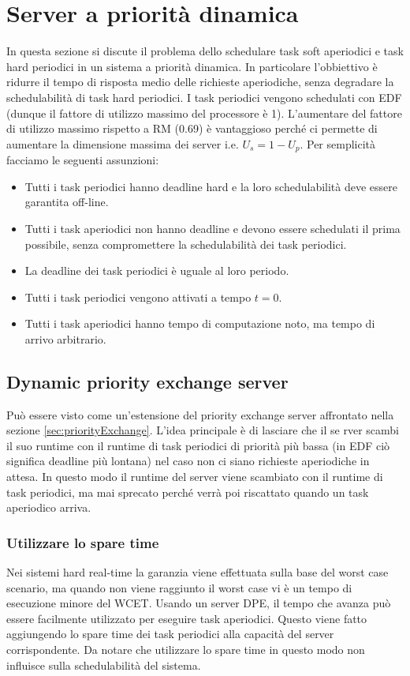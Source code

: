 \documentclass[12pt]{article}
\begin{document}
\section{Server a priorità dinamica}
In questa sezione si discute il problema dello schedulare task soft aperiodici e task hard periodici in un sistema a priorità dinamica.
In particolare l'obbiettivo è ridurre il tempo di risposta medio delle richieste aperiodiche, senza degradare la schedulabilità di task hard periodici.
I task periodici vengono schedulati con EDF (dunque il fattore di utilizzo massimo del processore è 1).
L'aumentare del fattore di utilizzo massimo rispetto a RM (0.69) è vantaggioso perché ci permette di aumentare la dimensione massima dei server i.e. $U_s = 1- U_p$.
Per semplicità facciamo le seguenti assunzioni:
\begin{itemize}
\item Tutti i task periodici hanno deadline hard e la loro schedulabilità deve essere garantita off-line.
\item Tutti i task aperiodici non hanno deadline e devono essere schedulati il prima possibile, senza compromettere la schedulabilità dei task periodici.
\item La deadline dei task periodici è uguale al loro periodo.
\item Tutti i task periodici vengono attivati a tempo $t=0$.
\item Tutti i task aperiodici hanno tempo di computazione noto, ma tempo di arrivo arbitrario.
\end{itemize}
\subsection{Dynamic priority exchange server}
\label{sec:dynamicPriorityExchange}
Può essere visto come un'estensione del priority exchange server affrontato nella sezione \ref{sec:priorityExchange}.
L'idea principale è di lasciare che il se rver scambi il suo runtime con il runtime di task periodici di priorità più bassa (in EDF ciò significa deadline più lontana) nel caso non ci siano richieste aperiodiche in attesa.
In questo modo il runtime del server viene scambiato con il runtime di task periodici, ma mai sprecato perché verrà poi riscattato quando un task aperiodico arriva.
\subsubsection{Utilizzare lo spare time}
Nei sistemi hard real-time la garanzia viene effettuata sulla base del worst case scenario, ma quando non viene raggiunto il worst case vi è un tempo di esecuzione minore del WCET.
Usando un server DPE, il tempo che avanza può essere facilmente utilizzato per eseguire task aperiodici.
Questo viene fatto aggiungendo lo spare time dei task periodici alla capacità del server corrispondente.
Da notare che utilizzare lo spare time in questo modo non influisce sulla schedulabilità del sistema.
\end{document}
